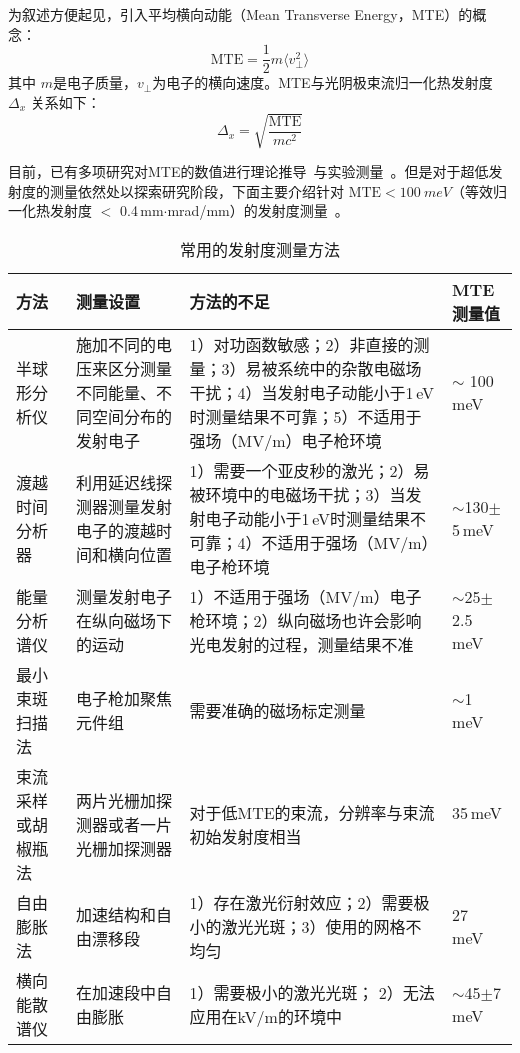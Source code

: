 为叙述方便起见，引入平均横向动能（Mean Transverse Energy，MTE）的概念\cite{bazarov2008thermal,bazarov2009maximum,lee2015review}：
\begin{equation}
\text{MTE} = \frac{1}{2}m\langle v_\perp^2\rangle
\end{equation}
其中 $m$是电子质量，$v_\perp$为电子的横向速度。MTE与光阴极束流归一化热发射度 $\Delta_{x}$ 关系如下：
\begin{equation}
\label{eq:es_MTE}
\Delta_{x} = \sqrt{\frac{\text{MTE}}{mc^2}}
\end{equation}

目前，已有多项研究对MTE的数值进行理论推导~\cite{karkare2011effect,karkare2013monte}与实验测量~\cite{bazarov2009maximum,engelen2014effective,dowell2009quantum,qian2012experimental}。但是对于超低发射度的测量依然处以探索研究阶段，下面主要介绍针对 $\text{MTE}<\SI{100}{meV}$（等效归一化热发射度 $<$ 0.4\,mm$\cdot$mrad/mm）的发射度测量~\cite{hauri2010intrinsic,lee2015review}。

\begin{table}[htbp]
\caption{常用的发射度测量方法}
\label{tab:method}
\centering
\begin{tabular}{p{2cm}p{3.5cm}p{5cm}p{2.5cm}}
\toprule
方法 & 测量设置 & 方法的不足 & MTE测量值 \\
\midrule
半球形分析仪~\cite{Palczewski:2010aa} & 施加不同的电压来区分测量不同能量、不同空间分布的发射电子 &1）对功函数敏感；2）非直接的测量；3）易被系统中的杂散电磁场干扰；4）当发射电子动能小于1\,eV时测量结果不可靠；5）不适用于强场（MV/m）电子枪环境 & $\sim$ 100\,meV~\cite{Droubay:2014aa} \\
渡越时间分析器~\cite{Wang:2012aa,Sertore:2004aa}  & 利用延迟线探测器测量发射电子的渡越时间和横向位置 &1）需要一个亚皮秒的激光；2）易被环境中的电磁场干扰；3）当发射电子动能小于1\,eV时测量结果不可靠；4）不适用于强场（MV/m）电子枪环境 & $\sim$130$\pm$5\,meV~\cite{sertore2004cesium} \\
能量分析谱仪~\cite{Karkare:2015aa,Orlov:2001aa} & 测量发射电子在纵向磁场下的运动 & 1）不适用于强场（MV/m）电子枪环境；2）纵向磁场也许会影响光电发射的过程，测量结果不准 & $\sim$25$\pm$2.5\,meV~\cite{Orlov:2001aa} \\
最小束斑扫描法~\cite{engelen2014effective,bazarov2008thermal,bazarov2011thermal,anderson2002space,hauri2010intrinsic} & 电子枪加聚焦元件组 & 需要准确的磁场标定测量 &  $\sim$1\,meV~\cite{engelen2014effective}\\
束流采样或胡椒瓶法~\cite{anderson2002space,Reiser:2008aa,gulliford2013demonstration} & 两片光栅加探测器或者一片光栅加探测器 & 对于低MTE的束流，分辨率与束流初始发射度相当 & 35\,meV ~\cite{Maxson:2015aa}\\
自由膨胀法~\cite{feng2015novel} & 加速结构和自由漂移段 & 1）存在激光衍射效应；2）需要极小的激光光斑；3）使用的网格不均匀 & 27\,meV~\cite{feng2015novel} \\
横向能散谱仪~\cite{jones2013commissioning}  & 在加速段中自由膨胀 & 1）需要极小的激光光斑； 2）无法应用在kV/m的环境中 & $\sim$45$\pm$7\,meV~\cite{jones2013commissioning} \\
\bottomrule
\end{tabular}
\end{table}

